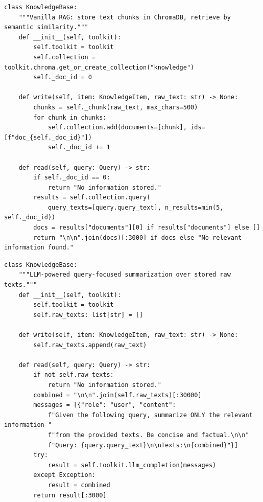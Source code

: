 \begin{lstlisting}[style=evolvedcode, caption={Seed 1: Vector Search.}, label=lst:seed-vector]
class KnowledgeBase:
    """Vanilla RAG: store text chunks in ChromaDB, retrieve by semantic similarity."""
    def __init__(self, toolkit):
        self.toolkit = toolkit
        self.collection = toolkit.chroma.get_or_create_collection("knowledge")
        self._doc_id = 0

    def write(self, item: KnowledgeItem, raw_text: str) -> None:
        chunks = self._chunk(raw_text, max_chars=500)
        for chunk in chunks:
            self.collection.add(documents=[chunk], ids=[f"doc_{self._doc_id}"])
            self._doc_id += 1

    def read(self, query: Query) -> str:
        if self._doc_id == 0:
            return "No information stored."
        results = self.collection.query(
            query_texts=[query.query_text], n_results=min(5, self._doc_id))
        docs = results["documents"][0] if results["documents"] else []
        return "\n\n".join(docs)[:3000] if docs else "No relevant information found."
\end{lstlisting}

\begin{lstlisting}[style=evolvedcode, caption={Seed 2: LLM Summarizer.}, label=lst:seed-llm]
class KnowledgeBase:
    """LLM-powered query-focused summarization over stored raw texts."""
    def __init__(self, toolkit):
        self.toolkit = toolkit
        self.raw_texts: list[str] = []

    def write(self, item: KnowledgeItem, raw_text: str) -> None:
        self.raw_texts.append(raw_text)

    def read(self, query: Query) -> str:
        if not self.raw_texts:
            return "No information stored."
        combined = "\n\n".join(self.raw_texts)[:30000]
        messages = [{"role": "user", "content":
            f"Given the following query, summarize ONLY the relevant information "
            f"from the provided texts. Be concise and factual.\n\n"
            f"Query: {query.query_text}\n\nTexts:\n{combined}"}]
        try:
            result = self.toolkit.llm_completion(messages)
        except Exception:
            result = combined
        return result[:3000]
\end{lstlisting}

